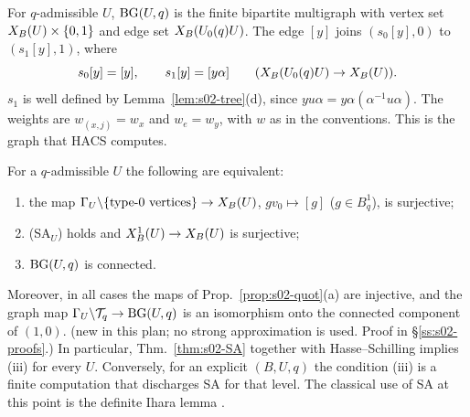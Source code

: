 \begin{definition}\label{def:s02-BG}
For $q$-admissible $U$, $\mathrm{BG}(U,q)$ is the finite bipartite multigraph with vertex set
$X_B(U)\times\{0,1\}$ and edge set $X_B(U_0(q)U)$. The edge $[y]$ joins $(s_0[y],0)$ to $(s_1[y],1)$, where
\[s_0[y]=[y],\qquad s_1[y]=[y\alpha]\qquad(X_B(U_0(q)U)\to X_B(U)).\]
$s_1$ is well defined by Lemma~\ref{lem:s02-tree}(d), since $y u\alpha=y\alpha(\alpha^{-1}u\alpha)$. The
weights are $w_{(x,j)}=w_x$ and $w_e=w_y$, with $w$ as in the conventions. This is the graph that HACS
computes.
\end{definition}

\begin{proposition}\label{prop:s02-BG}
For a $q$-admissible $U$ the following are equivalent:
\begin{enumerate}[label=(\roman*)]
\item the map $\Gamma_U\backslash\{\text{type-}0\text{ vertices}\}\to X_B(U)$, $g v_0\mapsto[g]$ ($g\in B^1_q$), is
  surjective;
\item (SA$_U$) holds and $X^1_B(U)\to X_B(U)$ is surjective;
\item $\mathrm{BG}(U,q)$ is connected.
\end{enumerate}
Moreover, in all cases the maps of Prop.~\ref{prop:s02-quot}(a) are injective, and the graph map
$\Gamma_U\backslash\mathcal{T}_q\to\mathrm{BG}(U,q)$ is an isomorphism onto the connected component of $(1,0)$.
\stproved{} (new in this plan; no strong approximation is used. Proof in \S\ref{ss:s02-proofs}.)
In particular, Thm.~\ref{thm:s02-SA} together with Hasse--Schilling implies (iii) for every $U$. Conversely,
for an explicit $(B,U,q)$ the condition (iii) is a finite computation that discharges SA for that level.
The classical use of SA at this point is the definite Ihara lemma .
\end{proposition}

